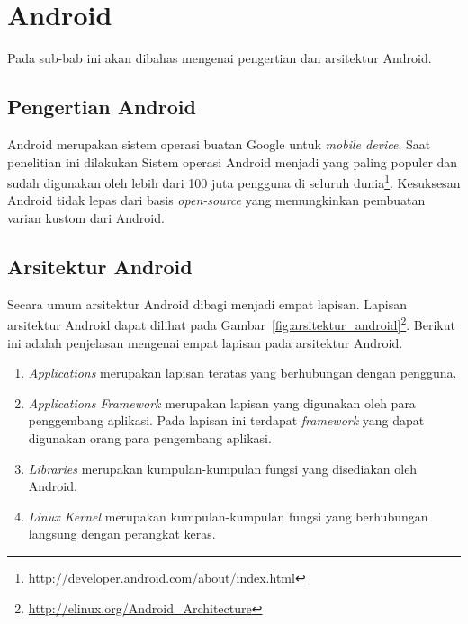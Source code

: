 \section{Android}
\label{sec:android}

Pada sub-bab ini akan dibahas mengenai pengertian dan arsitektur Android.

\subsection{Pengertian Android}
\label{subsec:pengertianandroid}

Android merupakan sistem operasi buatan Google untuk \textit{mobile device}. Saat penelitian ini dilakukan Sistem operasi Android menjadi yang paling populer dan sudah digunakan oleh lebih dari 100 juta pengguna di seluruh dunia\footnote{\url{http://developer.android.com/about/index.html}}. Kesuksesan Android tidak lepas dari basis \textit{open-source} yang memungkinkan pembuatan varian kustom dari Android.

\subsection{Arsitektur Android}
\label{subsec:arsitektur}

Secara umum arsitektur Android dibagi menjadi empat lapisan. Lapisan arsitektur Android dapat dilihat pada Gambar~\ref{fig:arsitektur_android}\footnote{\url{http://elinux.org/Android\_Architecture}}. Berikut ini adalah penjelasan mengenai empat lapisan pada arsitektur Android.

\begin{enumerate}
\item \textit{Applications} merupakan lapisan teratas yang berhubungan dengan pengguna.
\item \textit{Applications Framework} merupakan lapisan yang digunakan oleh para penggembang aplikasi. Pada lapisan ini terdapat \textit{framework} yang dapat digunakan orang para pengembang aplikasi. %
\item \textit{Libraries} merupakan kumpulan-kumpulan fungsi yang disediakan oleh Android.
\item \textit{Linux Kernel} merupakan kumpulan-kumpulan fungsi yang berhubungan langsung dengan perangkat keras.
\end{enumerate}

